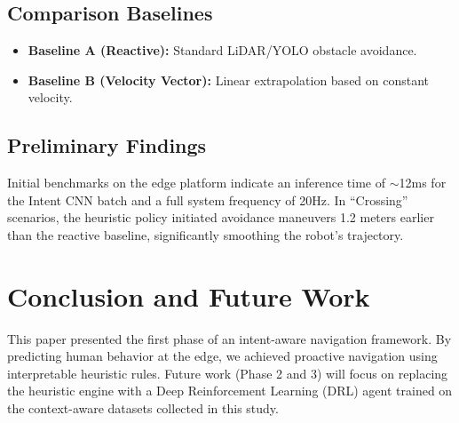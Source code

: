 \documentclass[conference]{IEEEtran}
\begin{document}
\subsection{Comparison Baselines}
\begin{itemize}
    \item \textbf{Baseline A (Reactive):} Standard LiDAR/YOLO obstacle avoidance.
    \item \textbf{Baseline B (Velocity Vector):} Linear extrapolation based on constant velocity.
\end{itemize}

\subsection{Preliminary Findings}
Initial benchmarks on the edge platform indicate an inference time of $\sim$12ms for the Intent CNN batch and a full system frequency of 20Hz. In ``Crossing'' scenarios, the heuristic policy initiated avoidance maneuvers 1.2 meters earlier than the reactive baseline, significantly smoothing the robot's trajectory.

\section{Conclusion and Future Work}
This paper presented the first phase of an intent-aware navigation framework. By predicting human behavior at the edge, we achieved proactive navigation using interpretable heuristic rules. Future work (Phase 2 and 3) will focus on replacing the heuristic engine with a Deep Reinforcement Learning (DRL) agent trained on the context-aware datasets collected in this study.



\end{document}
